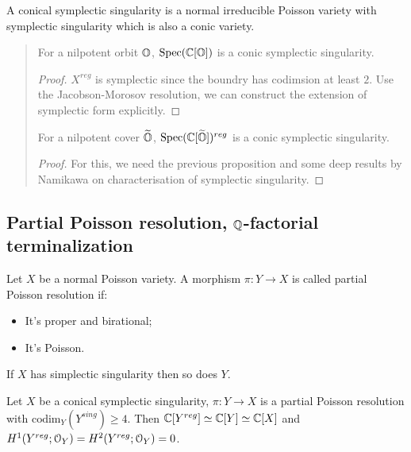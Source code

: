 \documentclass[12pt]{amsart}
\numberwithin{equation}{section}
\newcommand{\Spec}{\mathrm{Spec}}
\renewcommand{\tilde}{\widetilde}
\newcommand{\aiblock}[1]{
  \begin{quote} 
  {\color{CadetBlue}\sffamily\small #1}
  \end{quote}
}
\begin{document}
\begin{defn}
  A conical symplectic singularity is a normal irreducible Poisson variety with symplectic singularity which is also a conic variety.
\end{defn}

\aiblock{
\begin{prop}
  For a nilpotent orbit ${\mathbb {O}}$, $\Spec(\BC[\BO])$ is a conic symplectic singularity.
\end{prop}

\begin{proof}
  $X^{reg}$ is symplectic since the boundry has codimsion at least $2$.
  Use the Jacobson-Morosov resolution, we can construct the extension of symplectic form explicitly.
\end{proof}

\begin{prop}
  For a nilpotent cover $\tilde{\BO}$, $\Spec(\BC[\tilde{\BO}])^{reg}$ is a conic symplectic singularity.
\end{prop}

\begin{proof}
  For this, we need the previous proposition and some deep results by Namikawa on characterisation of symplectic singularity. 
\end{proof}



}


\subsection{Partial Poisson resolution, ${\mathbb {Q}}$-factorial terminalization}


\begin{defn}
  Let $X$ be a normal Poisson variety. A morphism $\pi: Y \to X$ is called partial Poisson resolution if:
  \begin{itemize}
    \item It's proper and birational;
    \item It's Poisson.
  \end{itemize} 
\end{defn}

\begin{prop}
  If $X$ has simplectic singularity then so does $Y$.
\end{prop}

\begin{prop}
  Let $X$ be a conical symplectic singularity, $\pi: Y \to X$ is a partial Poisson resolution with $\mathrm{codim}_Y(Y^{sing}) \geq 4$. Then ${\mathbb {C}}[Y^{reg}] \simeq {\mathbb {C}}[Y] \simeq {\mathbb {C}}[X]$ and $H^1(Y^{reg};{\mathcal {O}}_Y) = H^2(Y^{reg};{\mathcal {O}}_Y) = 0$.
\end{prop}
\end{document}
